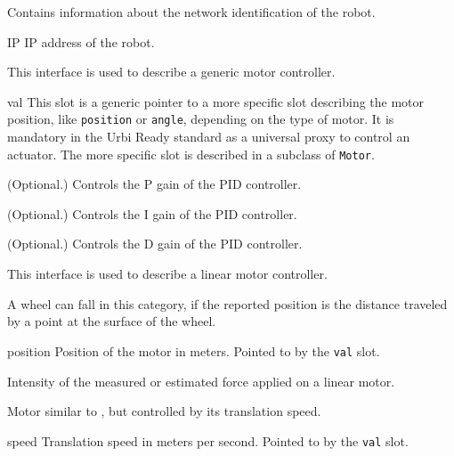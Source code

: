 
Contains information about the network identification of the robot.

\begin{urbiscriptapi}
\item[IP] IP address of the robot.
\end{urbiscriptapi}


This interface is used to describe a generic motor controller.

\begin{urbiscriptapi}
\item[val] This slot is a generic pointer to a more specific slot describing
  the motor position, like \lstinline{position} or \lstinline{angle},
  depending on the type of motor. It is mandatory in the Urbi Ready standard
  as a universal proxy to control an actuator. The more specific slot is
  described in a subclass of \lstinline{Motor}.
\item[PGain] (Optional.) Controls the P gain of the PID controller.
\item[IGain] (Optional.) Controls the I gain of the PID controller.
\item[DGain] (Optional.) Controls the D gain of the PID controller.
\end{urbiscriptapi}



This interface is used to describe a linear motor controller.

A wheel can fall in this category, if the reported position is the distance
traveled by a point at the surface of the wheel.

\begin{urbiscriptapi}
\item[position] Position of the motor in meters.  Pointed to by the
  \lstinline{val} slot.

\item[force] Intensity of the measured or estimated force applied on a
  linear motor.
\end{urbiscriptapi}


Motor similar to , but controlled by its translation
speed.

\begin{urbiscriptapi}
\item[speed] Translation speed in meters per second. Pointed to by the
  \lstinline{val} slot.
\end{urbiscriptapi}



